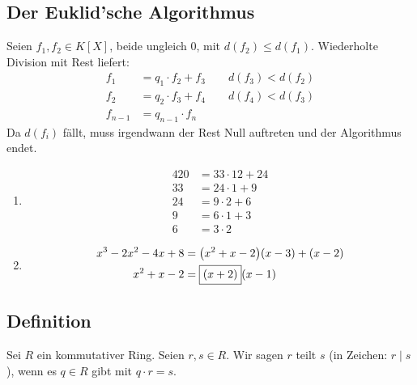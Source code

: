 \subsection{Der Euklid'sche Algorithmus} %
\label{sub:411}
Seien $f_1, f_2 \in K[X]$, beide ungleich $0$, mit $d(f_2) \le d(f_1)$. Wiederholte Division mit Rest liefert:
\begin{align*}
	f_1 &= q_1 \cdot f_2 + f_3 \qquad d(f_3) < d(f_2) \\
	f_2 &= q_2 \cdot f_3 + f_4 \qquad d(f_4) < d(f_3) \\
	f_{n-1} &= q_{n-1} \cdot f_n
\end{align*}
Da $d(f_i)$ fällt, muss irgendwann der Rest Null auftreten und der Algorithmus endet.
\begin{enumerate}[1)]
	\item \begin{align*}
		420 &= 33 \cdot 12 + 24 \\
		33 &= 24 \cdot 1 + 9 \\
		24 &= 9 \cdot 2 + 6 \\
		9 &= 6 \cdot 1 +3 \\
		6 &= \boxed{3} \cdot 2
	\end{align*}
	\item \begin{align*}
		x^3 - 2x^2 -4x +8 &= \enbrace*{x^2 +x -2} (x-3) + (x-2) \\ 
		x^2 +x-2 &= \boxed{(x+2)}(x-1)
	\end{align*}
\end{enumerate}

\subsection[Definition von $r$ teilt $s$]{Definition} %
\label{sub:412}
Sei $R$ ein kommutativer Ring. Seien $r,s \in R$. Wir sagen $r$ teilt $s$ (in Zeichen: $r \mid s$), wenn es $q \in R$ gibt mit $q \cdot r=s$.

